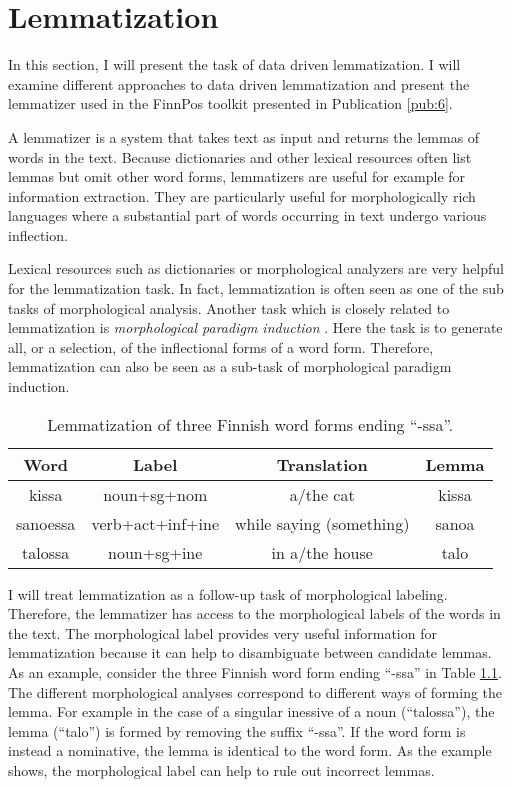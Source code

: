 \chapter{Lemmatization}
\label{chapter:lemmatization}

In this section, I will present the task of data driven
lemmatization. I will examine different approaches to data driven
lemmatization and present the lemmatizer used in the FinnPos toolkit
presented in Publication \ref{pub:6}.

A lemmatizer is a system that takes text as input and returns the
lemmas of words in the text. Because dictionaries and other lexical
resources often list lemmas but omit other word forms, lemmatizers are
useful for example for information extraction. They are particularly
useful for morphologically rich languages where a substantial part of
words occurring in text undergo various inflection.

Lexical resources such as dictionaries or morphological analyzers are
very helpful for the lemmatization task. In fact, lemmatization is
often seen as one of the sub tasks of morphological analysis. Another
task which is closely related to lemmatization is {\it morphological
  paradigm induction} \citep{Ahlberg2014}. Here the task is to
generate all, or a selection, of the inflectional forms of a word
form. Therefore, lemmatization can also be seen as a sub-task of
morphological paradigm induction.

\begin{table}[!htb]
\begin{center}
\begin{tabular}{c|c|c|c}
Word & Label & Translation & Lemma  \\
\hline
kissa & noun+sg+nom & a/the cat & kissa \\
sanoessa & verb+act+inf+ine & while saying (something) & sanoa \\
talossa & noun+sg+ine & in a/the house & talo
\end{tabular}
\caption{Lemmatization of three Finnish word forms ending ``-ssa''.}\label{tab:3wf}
\end{center}
\end{table}

I will treat lemmatization as a follow-up task of morphological
labeling. Therefore, the lemmatizer has access to the morphological
labels of the words in the text. The morphological label provides very
useful information for lemmatization because it can help to
disambiguate between candidate lemmas. As an example, consider the
three Finnish word form ending ``-ssa'' in Table \ref{tab:3wf}. The
different morphological analyses correspond to different ways of
forming the lemma. For example in the case of a singular inessive of a
noun (``talossa''), the lemma (``talo'') is formed by removing the
suffix ``-ssa''. If the word form is instead a nominative, the lemma
is identical to the word form. As the example shows, the morphological
label can help to rule out incorrect lemmas.

